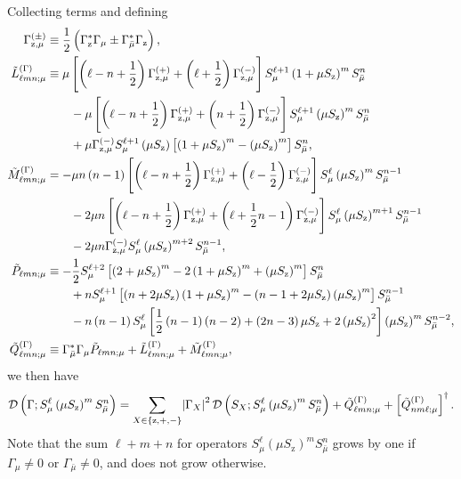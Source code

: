 \documentclass[aps,notitlepage,nofootinbib,11pt]{revtex4-1}
\newcommand{\f}[2]{\dfrac{#1}{#2}} %
\newcommand{\p}[1]{\left(#1\right)} %
\renewcommand{\sp}[1]{\left[#1\right]} %
\renewcommand{\set}[1]{\left\{#1\right\}} %
\newcommand{\D}{\mathcal{D}}
\newcommand{\z}{\text{z}}
\newcommand{\bmu}{{\bar\mu}}
\newcommand{\1}{\mathds{1}}
\begin{document}
Collecting terms and defining
\begin{align}
  \Gamma_{\z,\mu}^{(\pm)}
  &\equiv \f12\p{\Gamma_\z^* \Gamma_\mu \pm \Gamma_\bmu^* \Gamma_\z},
  \allowdisplaybreaks \\
  \tilde L_{\ell mn;\mu}^{(\Gamma)}
  &\equiv \mu \sp{\p{\ell-n+\f12} \Gamma_{\z,\mu}^{(+)}
    + \p{\ell+\f12} \Gamma_{\z,\mu}^{(-)}}
  S_\mu^{\ell+1} \p{1+\mu S_\z}^m S_\bmu^n \notag \\
  &\qquad -\mu \sp{\p{\ell-n+\f12} \Gamma_{\z,\mu}^{(+)}
    + \p{n+\f12} \Gamma_{\z,\mu}^{(-)}}
  S_\mu^{\ell+1} \p{\mu S_\z}^m S_\bmu^n \notag \\
  &\qquad + \mu \Gamma_{\z,\mu}^{(-)}
  S_\mu^{\ell+1} \p{\mu S_\z}
  \sp{\p{1+\mu S_\z}^m - \p{\mu S_\z}^m} S_\bmu^n,
  \allowdisplaybreaks \\
  \tilde M_{\ell mn;\mu}^{(\Gamma)}
  &= -\mu n\p{n-1} \sp{\p{\ell-n+\f12} \Gamma_{\z,\mu}^{(+)}
    + \p{\ell-\f12} \Gamma_{\z,\mu}^{(-)}}
  S_\mu^\ell \p{\mu S_\z}^m S_\bmu^{n-1} \notag \\
  &\qquad - 2\mu n \sp{\p{\ell-n+\f12} \Gamma_{\z,\mu}^{(+)}
    + \p{\ell+\f12n-1} \Gamma_{\z,\mu}^{(-)}}
  S_\mu^\ell \p{\mu S_\z}^{m+1} S_\bmu^{n-1} \notag \\
  &\qquad - 2\mu n \Gamma_{\z,\mu}^{(-)}
  S_\mu^\ell \p{\mu S_\z}^{m+2} S_\bmu^{n-1},
  \allowdisplaybreaks \\
  \tilde P_{\ell mn;\mu}
  &\equiv -\f12 S_\mu^{\ell+2}
  \sp{\p{2+\mu S_\z}^m - 2\p{1+\mu S_\z}^m + \p{\mu S_\z}^m}
  S_\bmu^n \notag \\
  &\qquad + n S_\mu^{\ell+1} \sp{\p{n+2\mu S_\z} \p{1+\mu S_\z}^m
    - \p{n-1+2\mu S_\z} \p{\mu S_\z}^m}
  S_\bmu^{n-1} \notag \\
  &\qquad -n\p{n-1} S_\mu^\ell
  \sp{\f12\p{n-1}\p{n-2} + \p{2n-3}\mu S_\z + 2\p{\mu S_\z}^2}
  \p{\mu S_\z}^m S_\bmu^{n-2},
  \allowdisplaybreaks \\
  \tilde Q_{\ell mn;\mu}^{(\Gamma)}
  &\equiv \Gamma_\bmu^* \Gamma_\mu \tilde P_{\ell mn;\mu}
  + \tilde L_{\ell mn;\mu}^{(\Gamma)}
  + \tilde M_{\ell mn;\mu}^{(\Gamma)},
\end{align}
we then have
\begin{align}
  \D\p{\Gamma; S_\mu^\ell \p{\mu S_\z}^m S_\bmu^n}
  = \sum_{X\in\set{\z,+,-}} \abs{\Gamma_X}^2
  \D\p{S_X; S_\mu^\ell \p{\mu S_\z}^m S_\bmu^n}
  + \tilde Q_{\ell mn;\mu}^{(\Gamma)}
  + \sp{\tilde Q_{nm\ell;\mu}^{(\Gamma)}}^\dag.
\end{align}
Note that the sum $\ell+m+n$ for operators
$S_\mu^\ell \p{\mu S_\z}^m S_\bmu^n$ grows by one if $\Gamma_\mu\ne0$
or $\Gamma_\bmu\ne0$, and does not grow otherwise.
\end{document}
